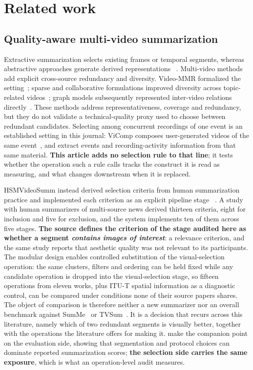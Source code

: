 \section{Related work}\label{sec:related}

\subsection{Quality-aware multi-video summarization}

Extractive summarization selects existing frames or temporal segments, whereas
abstractive approaches generate derived representations
~\citep{truong2007video_abstraction,apostolidis2021survey}. Multi-video methods
add explicit cross-source redundancy and diversity. Video-MMR formalized the
setting~\citep{li2010videommr}; sparse and collaborative formulations improved
diversity across topic-related videos~\citep{panda2017diversity,
panda2017collaborative}; graph models subsequently represented inter-video
relations directly~\citep{wu2020mvsgcn}. These methods address
representativeness, coverage and redundancy, but they do not validate a technical-quality proxy used to choose between redundant
candidates. Selecting among concurrent recordings of one event is an established setting in
this journal: ViComp composes user-generated videos of the same
event~\citep{bano2016vicomp}, and \citet{cricri2014multimodal} extract events and
recording-activity information from that same material. \textbf{This article adds no
selection rule to that line}; it tests whether the operation such a rule calls tracks the
construct it is read as measuring, and what changes downstream when it is replaced.

HSMVideoSumm instead derived selection criteria from human summarization
practice and implemented each criterion as an explicit pipeline stage
~\citep{barbieri2021content,barbieri2021tese}. A study with human summarizers of
multi-source news derived thirteen criteria, eight for inclusion and five for exclusion,
and the system implements ten of them across five stages. \textbf{The source defines the
criterion of the stage audited here as whether a segment \emph{contains images of
interest}}: a relevance criterion, and the same study reports that aesthetic quality was
not relevant to its participants. The modular design enables controlled substitution of the visual-selection operation: the same clusters, filters and ordering can be held fixed while any candidate operation is
dropped into the visual-selection stage, so fifteen operations from eleven works, plus ITU-T spatial information as a diagnostic
control, can be compared under conditions none of their source papers shares. The
object of comparison is therefore neither a new summarizer nor an overall benchmark
against SumMe~\citep{gygli2014summe} or TVSum~\citep{song2015tvsum}. It is a decision that recurs across this literature, namely which of two
redundant segments is visually better, together with the operations the literature
offers for making it. \citet{otani2019rethinking} make the companion point on the
evaluation side, showing that segmentation and protocol choices can dominate reported
summarization scores; \textbf{the selection side carries the same exposure}, which is what
an operation-level audit measures.

